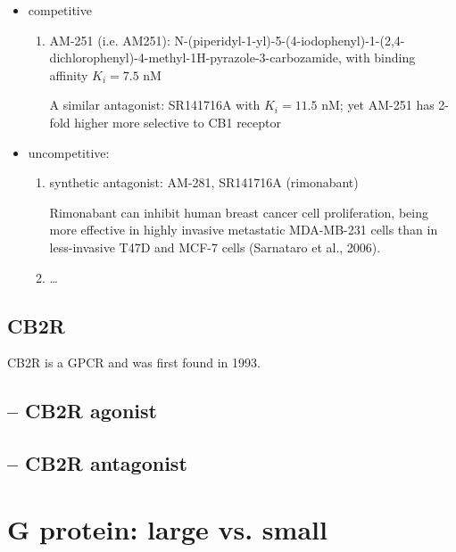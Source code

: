 \begin{itemize}

  \item competitive

\begin{enumerate}

  \item AM-251 (i.e. AM251):
  N-(piperidyl-1-yl)-5-(4-iodophenyl)-1-(2,4-dichlorophenyl)-4-methyl-1H-pyrazole-3-carbozamide,
  with binding affinity $K_i = 7.5$ nM
  
  A similar antagonist: SR141716A with $K_i = 11.5$ nM; yet AM-251 has 2-fold
  higher more selective to CB1 receptor
  
\end{enumerate}

  \item  uncompetitive: 

\begin{enumerate}
  \item synthetic antagonist: AM-281, SR141716A (rimonabant)
  
 Rimonabant can  inhibit human breast cancer cell proliferation, being more
 effective in highly invasive metastatic MDA-MB-231 cells than in less-invasive
 T47D and MCF-7 cells (Sarnataro et al., 2006).
 
  \item \ldots
\end{enumerate}
\end{itemize}


\subsection{CB2R}
\label{sec:CB2R}

CB2R is a GPCR and was first found in 1993.

\subsection{-- CB2R agonist}

\subsection{-- CB2R antagonist}




 
\section{G protein: large vs. small}
\label{sec:G-protein}

